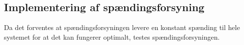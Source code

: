\subsection{Implementering af spændingsforsyning}
Da det forventes at spændingsforsyningen levere en konstant spænding til hele systemet for at det kan fungerer optimalt, testes spændingsforsyningen. 